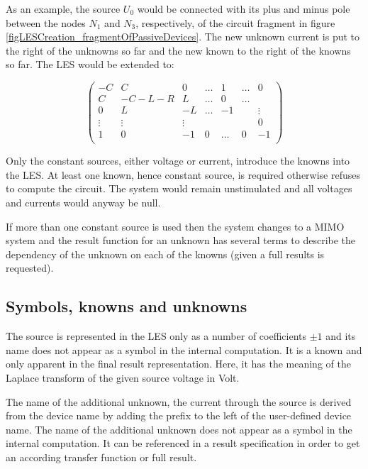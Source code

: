 As an example, the source $U_0$ would be connected with its plus and minus
pole between the nodes $N_1$ and $N_3$, respectively, of the circuit
fragment in figure \ref{figLESCreation_fragmentOfPassiveDevices}. The new
unknown current  is put to the right of the unknowns so far
and the new known to the right of the knowns so far. The LES would be
extended to:

\begin{displaymath}
\left(
\begin{array}{ccccccc}
-C      & C      &  0     & \ldots & 1      & \ldots & 0       \\
 C      & -C-L-R &  L     & \ldots & 0      & \ldots &         \\
 0      &    L   & -L     & \ldots & -1     &        & \vdots  \\
 \vdots & \vdots & \vdots &        &        &        & 0       \\
 1      &    0   & -1     & 0      & \ldots & 0      & -1      \\
\end{array}
\right)
\end{displaymath}

Only the constant sources, either voltage or current, introduce the knowns
into the LES. At least one known, hence constant source, is required
otherwise \linnet{} refuses to compute the circuit. The system would
remain unstimulated and all voltages and currents would anyway be null.

If more than one constant source is used then the system changes to a MIMO
system and the result function for an unknown has several terms to
describe the dependency of the unknown on each of the knowns (given a full
results is requested).


\subsection{Symbols, knowns and unknowns}

The source is represented in the LES only as a number of coefficients $\pm
1$ and its name does not appear as a symbol in the internal computation.
It is a known and only apparent in the final result representation. Here,
it has the meaning of the Laplace transform of the given source voltage in
Volt.

The name of the additional unknown, the current through the source is
derived from the device name by adding the prefix  to the left
of the user-defined device name. The name of the additional unknown does
not appear as a symbol in the internal computation. It can be referenced
in a result specification in order to get an according transfer function
or full result.



